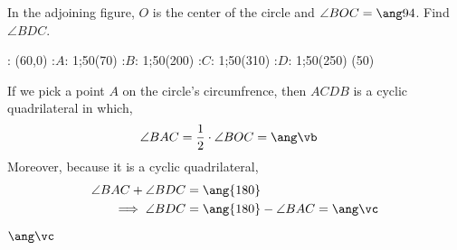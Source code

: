 

\DIVIDE{}\vb
{}\vb\vc

\question[2]  In the adjoining figure, $O$ is the center of the circle and $\angle BOC = \ang\va$.
Find $\angle BDC$.

\watchout

  : (60,0)
  :$A$: 1;50(70)
  :$B$: 1;50(200)
  :$C$: 1;50(310)
  :$D$: 1;50(250)
\figdrawbegin{}
(50)
  \figdrawline [3,1,4,5,3]
  \ifprintanswers
    \figdrawline [3,2,4]
  \fi
\figdrawend
{}

\ifprintanswers
  \begin{marginfigure}
    \centerline{\box\figBoxA}
  \end{marginfigure}
\else
  \vspace{1cm}
  \centerline{\box\figBoxA}
\fi

\begin{solution}[\halfpage]
	If we pick a point $A$ on the circle's circumfrence, then $ACDB$ is a cyclic 
	quadrilateral in which,
	\begin{align}
		\angle BAC &= \dfrac{1}{2}\cdot\angle BOC = \ang\vb
	\end{align}
	Moreover, because it is a cyclic quadrilateral, 
	\begin{align}
		\angle BAC + \angle BDC &= \ang{180} \\
		\implies \angle BDC &= \ang{180} - \angle BAC = \ang\vc
	\end{align}
\end{solution}
\ifprintanswers\begin{codex}$\ang\vc$\end{codex}\fi
